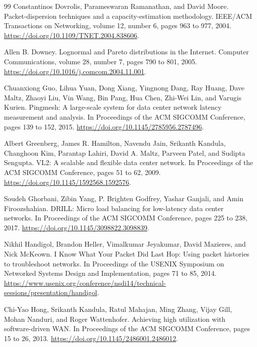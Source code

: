 \documentclass[a4paper,11pt]{report}
\begin{document}
\begin{thebibliography}{99}
Constantinos Dovrolis, Parameswaran Ramanathan, and David Moore.
\newblock Packet-dispersion techniques and a capacity-estimation methodology.
\newblock IEEE/ACM Transactions on Networking, volume 12, number 6, pages 963 to 977, 2004.
\newblock \url{https://doi.org/10.1109/TNET.2004.838606}.

Allen B. Downey.
\newblock Lognormal and Pareto distributions in the Internet.
\newblock Computer Communications, volume 28, number 7, pages 790 to 801, 2005.
\newblock \url{https://doi.org/10.1016/j.comcom.2004.11.001}.

Chuanxiong Guo, Lihua Yuan, Dong Xiang, Yingnong Dang, Ray Huang, Dave Maltz, Zhaoyi Liu, Vin Wang, Bin Pang, Hua Chen, Zhi-Wei Lin, and Varugis Kurien.
\newblock Pingmesh: A large-scale system for data center network latency measurement and analysis.
\newblock In Proceedings of the ACM SIGCOMM Conference, pages 139 to 152, 2015.
\newblock \url{https://doi.org/10.1145/2785956.2787496}.

Albert Greenberg, James R. Hamilton, Navendu Jain, Srikanth Kandula, Changhoon Kim, Parantap Lahiri, David A. Maltz, Parveen Patel, and Sudipta Sengupta.
\newblock VL2: A scalable and flexible data center network.
\newblock In Proceedings of the ACM SIGCOMM Conference, pages 51 to 62, 2009.
\newblock \url{https://doi.org/10.1145/1592568.1592576}.

Soudeh Ghorbani, Zibin Yang, P. Brighten Godfrey, Yashar Ganjali, and Amin Firoozshahian.
\newblock DRILL: Micro load balancing for low-latency data center networks.
\newblock In Proceedings of the ACM SIGCOMM Conference, pages 225 to 238, 2017.
\newblock \url{https://doi.org/10.1145/3098822.3098839}.

Nikhil Handigol, Brandon Heller, Vimalkumar Jeyakumar, David Mazieres, and Nick McKeown.
\newblock I Know What Your Packet Did Last Hop: Using packet histories to troubleshoot networks.
\newblock In Proceedings of the USENIX Symposium on Networked Systems Design and Implementation, pages 71 to 85, 2014.
\newblock \url{https://www.usenix.org/conference/nsdi14/technical-sessions/presentation/handigol}.

Chi-Yao Hong, Srikanth Kandula, Ratul Mahajan, Ming Zhang, Vijay Gill, Mohan Nanduri, and Roger Wattenhofer.
\newblock Achieving high utilization with software-driven WAN.
\newblock In Proceedings of the ACM SIGCOMM Conference, pages 15 to 26, 2013.
\newblock \url{https://doi.org/10.1145/2486001.2486012}.


\end{thebibliography}
\end{document}
